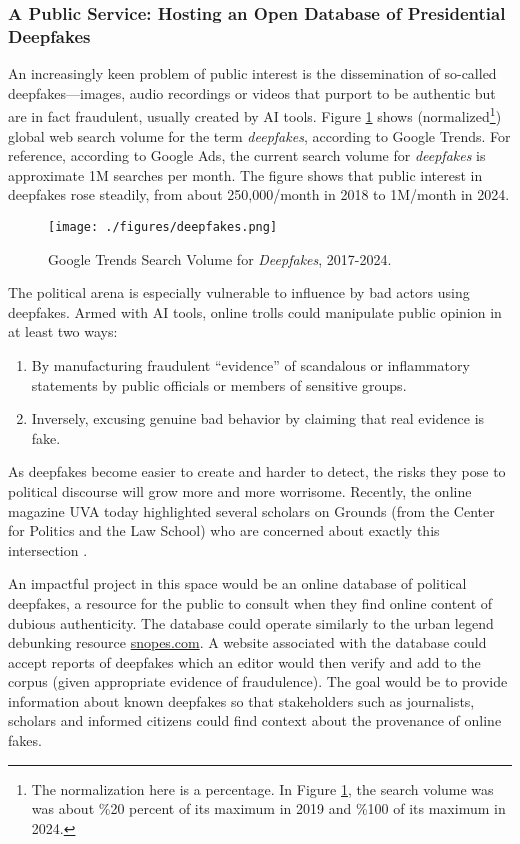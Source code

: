 \documentclass[12pt, oneside]{article}   	%
\begin{document}
\subsubsection{A Public Service: Hosting an Open Database of Presidential Deepfakes}\label{section.applications.easy.deepfakes}
An increasingly keen problem of public interest is the dissemination of so-called deepfakes—images, audio recordings or videos that purport to be authentic but are in fact fraudulent, usually created by AI tools.  Figure \ref{figure.deepfakes} shows (normalized\footnote{The normalization here is a percentage.  In Figure \ref{figure.deepfakes}, the search volume was was about \%20 percent of its maximum in 2019 and  \%100 of its maximum in 2024.}) global web search volume for the term \emph{deepfakes}, according to Google Trends.  For reference, according to Google Ads, the current search volume for \emph{deepfakes} is approximate 1M searches per month. The figure shows that public interest in deepfakes rose steadily, from about 250,000/month in 2018 to 1M/month in 2024.  


\begin{figure}[htbp]
\begin{center}
\texttt{[image: ./figures/deepfakes.png]}
\caption{Google Trends Search Volume for \emph{Deepfakes}, 2017-2024.}
\label{figure.deepfakes}
\end{center}
\end{figure}

The political arena is especially vulnerable to influence by bad actors using deepfakes.  Armed with AI tools, online trolls could manipulate public opinion in at least two ways:
\begin{enumerate}
\item By manufacturing fraudulent “evidence” of scandalous or inflammatory statements by public officials or members of sensitive groups.
\item Inversely, excusing genuine bad behavior by claiming that real evidence is fake.
\end{enumerate}
As deepfakes become easier to create and harder to detect, the risks they pose to political discourse will grow more and more worrisome.  Recently, the online magazine UVA today highlighted several scholars on Grounds (from the Center for Politics and the Law School) who are concerned about exactly this intersection \cite{mckenzie:2023}.

An impactful project in this space would be an online database of political deepfakes, a resource for the public to consult when they find online content of dubious authenticity.  The database could operate similarly to the urban legend debunking resource \href{https://snopes.com}{snopes.com}.  A website associated with the database could accept reports of deepfakes which an editor would then verify and add to the corpus (given appropriate evidence of fraudulence).  The goal would be to provide information about known deepfakes so that stakeholders such as journalists, scholars and informed citizens could find context about the provenance of online fakes.
\end{document}
